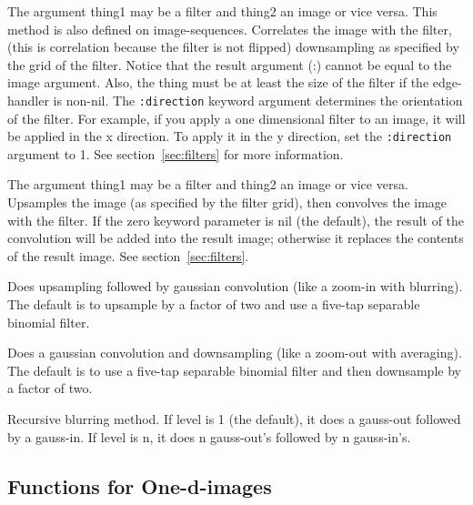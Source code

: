 \begin{description}
\item{}
The argument thing1 may be a filter and thing2 an image or vice versa.
This method is also defined on image-sequences.  Correlates the image
with the filter, (this is correlation because the filter is not
flipped) downsampling as specified by the grid of the filter.  Notice
that the result argument (:\res) cannot be equal to the image
argument.  Also, the thing must be at least the size of the filter if
the edge-handler is non-nil.  The {\tt :direction} keyword argument
determines the orientation of the filter.  For example, if you apply a
one dimensional filter to an image, it will be applied in the x
direction.  To apply it in the y direction, set the {\tt :direction}
argument to 1.  See section~\ref{sec:filters} for more information.

\item{}
The argument thing1 may be a filter and thing2 an image or vice versa.
Upsamples the image (as specified by the filter grid), then convolves
the image with the filter.  If the zero keyword parameter is nil (the
default), the result of the convolution will be added into the result
image; otherwise it replaces the contents of the result image.  See
section~\ref{sec:filters}.

\item{}
Does upsampling followed by gaussian convolution (like a zoom-in with
blurring).  The default is to upsample by a factor of two and use a
five-tap separable binomial filter.

\item{}
Does a gaussian convolution and downsampling (like a zoom-out with
averaging).  The default is to use a five-tap separable binomial
filter and then downsample by a factor of two.

\item{}
Recursive blurring method.  If level is 1 (the default), it does a
gauss-out followed by a gauss-in.  If level is n, it does n
gauss-out's followed by n gauss-in's.
\end{description}


\subsection{Functions for One-d-images}

